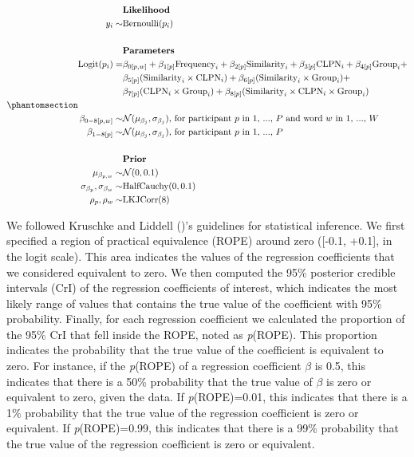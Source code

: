 \documentclass[
  man,
  longtable,
  nolmodern,
  notxfonts,
  notimes,
  colorlinks=true,linkcolor=blue,citecolor=blue,urlcolor=blue]{apa7}
\begin{document}
\begin{equation}\phantomsection\label{eq-1}{
\begin{aligned}
&\textbf{Likelihood}  \\
y_{i} \sim & \text{Bernoulli}(p_{i}) \\ \\
&\textbf{Parameters}  \\
\text{Logit}(p_{i}) = &  \beta_{0[p,w]} + \beta_{1[p]} \text{Frequency}_{i} + \beta_{2[p]} \text{Similarity}_i +  \beta_{3[p]} \text{CLPN}_i + \beta_{4[p]} \text{Group}_i + \\
&\beta_{5[p]} (\text{Similarity}_i \times \text{CLPN}_i) + \beta_{6[p]} (\text{Similarity}_i \times \text{Group}_i) + \\
& \beta_{7[p]} (\text{CLPN}_i \times \text{Group}_i) + \beta_{8[p]} (\text{Similarity}_i \times \text{CLPN}_i \times \text{Group}_i) \\ \\
\beta_{0-8[p,w]} \sim & \mathcal{N}(\mu_{\beta_{j}}, \sigma_{\beta_{j}}) \text{, for participant } p \text{ in 1, ..., } P \text{ and  word } w \text{ in 1, ..., } W \\
\beta_{1-8[p]} \sim &  \mathcal{N}(\mu_{\beta_{j}}, \sigma_{\beta_{j}}) \text{, for participant } p \text{ in 1, ..., } P \\ \\
&\textbf{Prior}  \\
\mu_{\beta_{p,w}}  \sim &  \mathcal{N}(0, 0.1) \\
\sigma_{\beta_{p}},  \sigma_{\beta_{w}} \sim & \text{HalfCauchy}(0, 0.1) \\
\rho_{p}, \rho_{w} \sim & \text{LKJCorr}(8) \\
\end{aligned}
}\end{equation}

We followed Kruschke and Liddell
()'s guidelines for statistical
inference. We first specified a region of practical equivalence (ROPE)
around zero ({[}-0.1, +0.1{]}, in the logit scale). This area indicates
the values of the regression coefficients that we considered equivalent
to zero. We then computed the 95\% posterior credible intervals (CrI) of
the regression coefficients of interest, which indicates the most likely
range of values that contains the true value of the coefficient with
95\% probability. Finally, for each regression coefficient we calculated
the proportion of the 95\% CrI that fell inside the ROPE, noted as
\emph{p}(ROPE). This proportion indicates the probability that the true
value of the coefficient is equivalent to zero. For instance, if the
\emph{p}(ROPE) of a regression coefficient \(\beta\) is 0.5, this
indicates that there is a 50\% probability that the true value of
\(\beta\) is zero or equivalent to zero, given the data. If
\emph{p}(ROPE)=0.01, this indicates that there is a 1\% probability that
the true value of the regression coefficient is zero or equivalent. If
\emph{p}(ROPE)=0.99, this indicates that there is a 99\% probability
that the true value of the regression coefficient is zero or equivalent.
\end{document}
